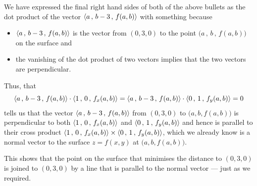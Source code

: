 \begin{eg}[Optional]
\begin{itemize}
\end{itemize}
We have expressed the final right hand sides of both of the above bullets
as the dot product of the vector $\left< a\,,\,b-3\,,\, f(a,b)\right>$
with something because
\begin{itemize}\itemsep1pt \parskip0pt 
\item[$\circ$] 
$\left< a\,,\,b-3\,,\, f(a,b)\right>$ is the vector from $(0,3,0)$
to the point $(a\,,\,b\,,\, f(a,b)\big)$ on the surface and
\item[$\circ$] the vanishing of the dot product of two vectors
implies that the two vectors are perpendicular.
\end{itemize}
Thus, that
\begin{equation*}
\left< a\,,\,b-3\,,\, f(a,b)\right>\cdot\left< 1\,,\,0\,,\, f_x(a,b)\right>
=\left< a\,,\,b-3\,,\, f(a,b)\right>\cdot\left< 0\,,\,1\,,\, f_y(a,b)\right>
=0
\end{equation*}
 tells us that the vector $\left< a\,,\,b-3\,,\, f(a,b)\right>$
from $(0,3,0)$ to $\big(a,b,f(a,b)\big)$ is perpendicular to both 
$\left< 1\,,\,0\,,\, f_x(a,b)\right>$ and $\left< 0\,,\,1\,,\, f_y(a,b)\right>$
and hence is parallel to their cross product
$\left< 1\,,\, 0\,,\, f_x(a,b)\right>\times\left< 0\,,\, 1\,,\, f_y(a,b)\right>$,
which we already know is a normal vector to the surface $z=f(x,y)$ at 
 $\big(a,b,f(a,b)\big)$. 

This shows that the point on the surface that minimises the distance 
to $(0,3,0)$ is joined to $(0,3,0)$ by a line that is parallel to the 
normal vector --- just as we required. 

\end{eg}

